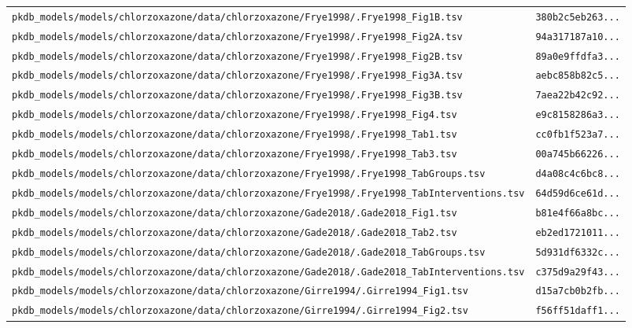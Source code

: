 \documentclass{article}
\begin{document}
\begin{longtable}{ll}
\texttt{pkdb\_models/models/chlorzoxazone/data/chlorzoxazone/Frye1998/.Frye1998\_Fig1B.tsv} & \texttt{380b2c5eb263...} \\
\texttt{pkdb\_models/models/chlorzoxazone/data/chlorzoxazone/Frye1998/.Frye1998\_Fig2A.tsv} & \texttt{94a317187a10...} \\
\texttt{pkdb\_models/models/chlorzoxazone/data/chlorzoxazone/Frye1998/.Frye1998\_Fig2B.tsv} & \texttt{89a0e9ffdfa3...} \\
\texttt{pkdb\_models/models/chlorzoxazone/data/chlorzoxazone/Frye1998/.Frye1998\_Fig3A.tsv} & \texttt{aebc858b82c5...} \\
\texttt{pkdb\_models/models/chlorzoxazone/data/chlorzoxazone/Frye1998/.Frye1998\_Fig3B.tsv} & \texttt{7aea22b42c92...} \\
\texttt{pkdb\_models/models/chlorzoxazone/data/chlorzoxazone/Frye1998/.Frye1998\_Fig4.tsv} & \texttt{e9c8158286a3...} \\
\texttt{pkdb\_models/models/chlorzoxazone/data/chlorzoxazone/Frye1998/.Frye1998\_Tab1.tsv} & \texttt{cc0fb1f523a7...} \\
\texttt{pkdb\_models/models/chlorzoxazone/data/chlorzoxazone/Frye1998/.Frye1998\_Tab3.tsv} & \texttt{00a745b66226...} \\
\texttt{pkdb\_models/models/chlorzoxazone/data/chlorzoxazone/Frye1998/.Frye1998\_TabGroups.tsv} & \texttt{d4a08c4c6bc8...} \\
\texttt{pkdb\_models/models/chlorzoxazone/data/chlorzoxazone/Frye1998/.Frye1998\_TabInterventions.tsv} & \texttt{64d59d6ce61d...} \\
\texttt{pkdb\_models/models/chlorzoxazone/data/chlorzoxazone/Gade2018/.Gade2018\_Fig1.tsv} & \texttt{b81e4f66a8bc...} \\
\texttt{pkdb\_models/models/chlorzoxazone/data/chlorzoxazone/Gade2018/.Gade2018\_Tab2.tsv} & \texttt{eb2ed1721011...} \\
\texttt{pkdb\_models/models/chlorzoxazone/data/chlorzoxazone/Gade2018/.Gade2018\_TabGroups.tsv} & \texttt{5d931df6332c...} \\
\texttt{pkdb\_models/models/chlorzoxazone/data/chlorzoxazone/Gade2018/.Gade2018\_TabInterventions.tsv} & \texttt{c375d9a29f43...} \\
\texttt{pkdb\_models/models/chlorzoxazone/data/chlorzoxazone/Girre1994/.Girre1994\_Fig1.tsv} & \texttt{d15a7cb0b2fb...} \\
\texttt{pkdb\_models/models/chlorzoxazone/data/chlorzoxazone/Girre1994/.Girre1994\_Fig2.tsv} & \texttt{f56ff51daff1...} \\

\end{longtable}
\end{document}
